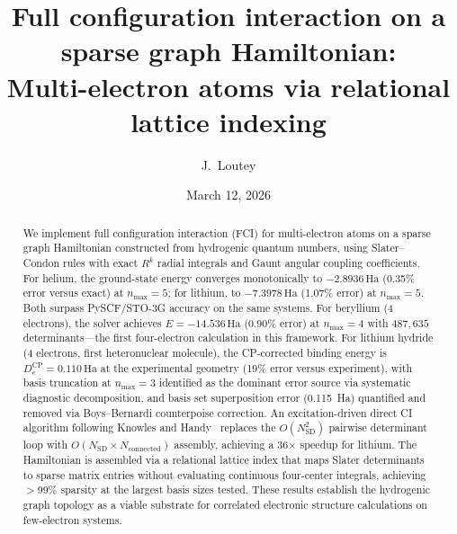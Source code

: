\documentclass[aps,pra,twocolumn,superscriptaddress,longbibliography,floatfix]{revtex4-2}
\begin{document}
\title{Full configuration interaction on a sparse graph Hamiltonian:\\
Multi-electron atoms via relational lattice indexing}

\author{J.~Loutey}

\date{March 12, 2026}

\begin{abstract}
We implement full configuration interaction (FCI) for multi-electron
atoms on a sparse graph Hamiltonian constructed from hydrogenic quantum
numbers, using Slater--Condon rules with exact $R^k$ radial integrals
and Gaunt angular coupling coefficients.
For helium, the ground-state energy converges monotonically to
$-2.8936\,\text{Ha}$ (0.35\% error versus exact) at $n_{\max}=5$;
for lithium, to $-7.3978\,\text{Ha}$ (1.07\% error) at $n_{\max}=5$.
Both surpass PySCF/STO-3G accuracy on the same systems.
For beryllium (4 electrons), the solver achieves $E = -14.536\,\text{Ha}$
(0.90\% error) at $n_{\max}=4$ with $487{,}635$ determinants---the
first four-electron calculation in this framework.
For lithium hydride (4 electrons, first heteronuclear molecule), the
CP-corrected binding energy is $D_e^{\text{CP}} = 0.110\,\text{Ha}$ at the
experimental geometry (19\% error versus experiment), with basis truncation
at $n_{\max}=3$ identified as the dominant error source via systematic
diagnostic decomposition, and basis set superposition error (0.115~Ha)
quantified and removed via Boys--Bernardi counterpoise correction.
An excitation-driven direct CI algorithm following
Knowles and Handy~\cite{Knowles1984} replaces the $O(N_{\text{SD}}^2)$
pairwise determinant loop with $O(N_{\text{SD}} \times N_{\text{connected}})$
assembly, achieving a 36$\times$ speedup for lithium.
The Hamiltonian is assembled via a relational lattice index that maps
Slater determinants to sparse matrix entries without evaluating
continuous four-center integrals, achieving $>$99\% sparsity at the
largest basis sizes tested.
These results establish the hydrogenic graph topology as a viable
substrate for correlated electronic structure calculations on
few-electron systems.
\end{abstract}

\maketitle
\end{document}

